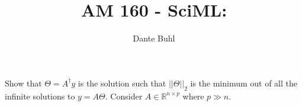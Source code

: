 \documentclass{article}
\begin{document}
\title{AM 160 - SciML:}
\author{Dante Buhl}


\newcommand{\wrms}{w_{\text{rms}}}
\newcommand{\bs}[1]{\boldsymbol{#1}}
\newcommand{\tb}[1]{\textbf{#1}}
\newcommand{\bmp}[1]{\begin{minipage}{#1\textwidth}}
\newcommand{\emp}{\end{minipage}}
\newcommand{\R}{\mathbb{R}}
\newcommand{\C}{\mathbb{C}}
\newcommand{\N}{\mathcal{N}}
\newcommand{\K}{\bs{\mathrm{K}}}
\newcommand{\m}{\bs{\mu}_*}
\newcommand{\s}{\bs{\Sigma}_*}
\newcommand{\dt}{\Delta t}
\newcommand{\dx}{\Delta x}
\newcommand{\tr}[1]{\text{Tr}(#1)}
\newcommand{\Tr}[1]{\text{Tr}(#1)}
\newcommand{\Div}{\nabla \cdot}
\renewcommand{\div}{\nabla \cdot}
\newcommand{\Curl}{\nabla \times}
\newcommand{\Grad}{\nabla}
\newcommand{\grad}{\nabla}
\newcommand{\grads}{\nabla_s}
\newcommand{\gradf}{\nabla_f}
\newcommand{\xs}{x_s}
\newcommand{\xf}{x_f}
\newcommand{\ts}{t_s}
\newcommand{\tf}{t_f}
\newcommand{\pt}{\partial t}
\newcommand{\pz}{\partial z}
\newcommand{\uvec}{\bs{u}}
\newcommand{\F}{\bs{F}}
\newcommand{\T}{\tilde{T}}
\newcommand{\ez}{\bs{e}_z}
\newcommand{\ex}{\bs{e}_x}
\newcommand{\ey}{\bs{e}_y}
\newcommand{\eo}{\bs{e}_{\bs{\Omega}}}
\newcommand{\ppt}[1]{\frac{\partial #1}{\partial t}}
\newcommand{\DDt}[1]{\frac{D #1}{D t}}
\newcommand{\ppts}[1]{\frac{\partial #1}{\partial t_s}}
\newcommand{\pptf}[1]{\frac{\partial #1}{\partial t_f}}
\newcommand{\ppz}[1]{\frac{\partial #1}{\partial z}}
\newcommand{\ddz}[1]{\frac{d #1}{d z}}
\newcommand{\ppzetas}[1]{\frac{\partial^2 #1}{\partial \zeta^2}}
\newcommand{\ppzs}[1]{\frac{\partial #1}{\partial z_s}}
\newcommand{\ppzf}[1]{\frac{\partial #1}{\partial z_f}}
\newcommand{\ppx}[1]{\frac{\partial #1}{\partial x}}
\newcommand{\ppxi}[1]{\frac{\partial #1}{\partial x_i}}
\newcommand{\ppxj}[1]{\frac{\partial #1}{\partial x_j}}
\newcommand{\ppy}[1]{\frac{\partial #1}{\partial y}}
\newcommand{\ppzeta}[1]{\frac{\partial #1}{\partial \zeta}}


\maketitle 
\setlength{\parindent}{0pt}
\doublespacing

\section{}

\subsection{}
Show that $\Theta = A^{\dagger}y$ is the solution such that $||\Theta||_2$ is
the minimum out of all the infinite solutions to $y = A\Theta$. Consider $A \in
\R^{n\times p}$ where $p\gg n$. 
\end{document}
